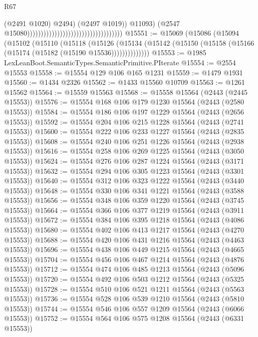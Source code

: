 \begin{lexlean}{R67}
\begin{coremodule}
                                                                              (@2491 @1020)
                                                                              @2494)
                                                                            (@2497 @1019))
                                                                          @11093)
                                                                        (@2547
                                                                          @15080)))))))))))))))))))))))))))))))))))
@15551 := @15069
    (@15086
      (@15094
        (@15102
          (@15110
            (@15118
              (@15126
                (@15134 (@15142 (@15150 (@15158 (@15166 (@15174 (@15182 (@15190 @15536))))))))))))))
@15553 := @1985 LexLeanBoot.SemanticTypes.SemanticPrimitive.PIterate
@15554 := @2554 @15553
@15558 := @15554 @129 @106 @165 @1231
@15559 := @1479 @1931
@15560 := @1434 @2326
@15562 := @1433 @15560 @10709
@15563 := @1261 @15562
@15564 := @15559 @15563
@15568 := @15558 @15564 (@2443 (@2445 @15553))
@15576 := @15554 @168 @106 @179 @1230 @15564 (@2443 (@2580 @15553))
@15584 := @15554 @186 @106 @197 @1229 @15564 (@2443 (@2656 @15553))
@15592 := @15554 @204 @106 @215 @1228 @15564 (@2443 (@2741 @15553))
@15600 := @15554 @222 @106 @233 @1227 @15564 (@2443 (@2835 @15553))
@15608 := @15554 @240 @106 @251 @1226 @15564 (@2443 (@2938 @15553))
@15616 := @15554 @258 @106 @269 @1225 @15564 (@2443 (@3050 @15553))
@15624 := @15554 @276 @106 @287 @1224 @15564 (@2443 (@3171 @15553))
@15632 := @15554 @294 @106 @305 @1223 @15564 (@2443 (@3301 @15553))
@15640 := @15554 @312 @106 @323 @1222 @15564 (@2443 (@3440 @15553))
@15648 := @15554 @330 @106 @341 @1221 @15564 (@2443 (@3588 @15553))
@15656 := @15554 @348 @106 @359 @1220 @15564 (@2443 (@3745 @15553))
@15664 := @15554 @366 @106 @377 @1219 @15564 (@2443 (@3911 @15553))
@15672 := @15554 @384 @106 @395 @1218 @15564 (@2443 (@4086 @15553))
@15680 := @15554 @402 @106 @413 @1217 @15564 (@2443 (@4270 @15553))
@15688 := @15554 @420 @106 @431 @1216 @15564 (@2443 (@4463 @15553))
@15696 := @15554 @438 @106 @449 @1215 @15564 (@2443 (@4665 @15553))
@15704 := @15554 @456 @106 @467 @1214 @15564 (@2443 (@4876 @15553))
@15712 := @15554 @474 @106 @485 @1213 @15564 (@2443 (@5096 @15553))
@15720 := @15554 @492 @106 @503 @1212 @15564 (@2443 (@5325 @15553))
@15728 := @15554 @510 @106 @521 @1211 @15564 (@2443 (@5563 @15553))
@15736 := @15554 @528 @106 @539 @1210 @15564 (@2443 (@5810 @15553))
@15744 := @15554 @546 @106 @557 @1209 @15564 (@2443 (@6066 @15553))
@15752 := @15554 @564 @106 @575 @1208 @15564 (@2443 (@6331 @15553))

\end{coremodule}
\end{lexlean}

